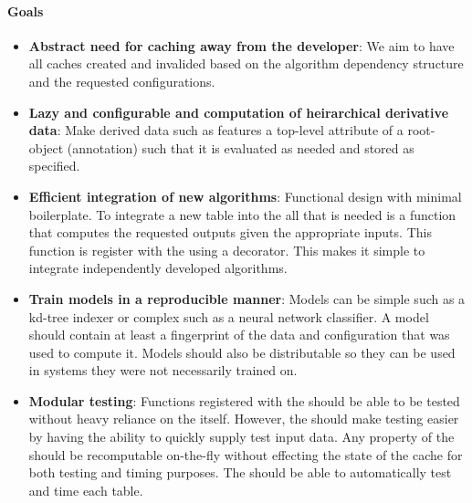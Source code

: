     \paragraph{Goals}
    \begin{itemize}
        \item \textbf{Abstract need for caching away from the developer}:
        We aim to have all caches created and invalided based on the
          algorithm dependency structure and the requested
          configurations.

        \item \textbf{Lazy and configurable and computation of
                heirarchical derivative data}: 
            Make derived data such as features a top-level attribute
              of a root-object (annotation) such that it is evaluated as
              needed and stored as specified.

          \item \textbf{Efficient integration of new algorithms}:
            Functional design with minimal boilerplate.
            To integrate a new table into the \depcache{} all that is
              needed is a function that computes the requested outputs
              given the appropriate inputs.
            This function is register with the \depcache{} using a
              decorator.
            This makes it simple to integrate independently developed
              algorithms.

          \item \textbf{Train models in a reproducible manner}:
            Models can be simple such as a kd-tree indexer or complex
              such as a neural network classifier.
            A model should contain at least a fingerprint of the data
              and configuration that was used to compute it.
            Models should also be distributable so they can be used in
              systems they were not necessarily trained on.

          \item \textbf{Modular testing}:
            Functions registered with the \depcache{} should be able
              to be tested without heavy reliance on the \depcache{}
              itself.
            However, the \depcache{} should make testing easier by
              having the ability to quickly supply test input data.
            Any property of the \depcache{}  should be recomputable
              on-the-fly without effecting the state of the cache for
              both testing and timing purposes.
            The \depcache{} should be able to automatically test and
              time each table.
      \end{itemize}

